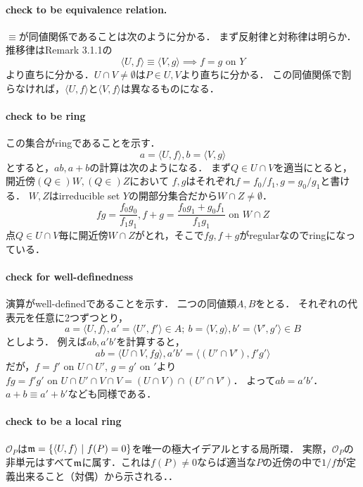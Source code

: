 \documentclass[a4paper]{jarticle}
\begin{document}
    \paragraph{check to be equivalence relation.}
    $\equiv$が同値関係であることは次のように分かる．
    まず反射律と対称律は明らか．
    推移律はRemark 3.1.1の
    \[ \langle U,f \rangle \equiv \langle V,g \rangle \implies f=g \mbox{ on } Y  \]
    より直ちに分かる．$U \cap V \neq \emptyset$は$P \in U, V$より直ちに分かる．
    この同値関係で割らなければ，$\langle U,f \rangle$と$\langle V,f \rangle$は異なるものになる．

    \paragraph{check to be ring}
    この集合がringであることを示す．
    \[ a=\langle U,f \rangle, b=\langle V,g \rangle \]
    とすると，$ab, a+b$の計算は次のようになる．
    まず$Q \in U \cap V$を適当にとると，開近傍$(Q \in )W, (Q \in )Z$において
    $f,g$はそれぞれ$f=f_0/f_1, g=g_0/g_1$と書ける．
    $W,Z$はirreducible set $Y$の開部分集合だから$W \cap Z \neq \emptyset$．
    \[ fg=\frac{f_0 g_0}{f_1 g_1}, f+g=\frac{f_0 g_1+g_0 f_1}{f_1 g_1} \mbox{ on } W \cap Z \]
    点$Q \in U \cap V$毎に開近傍$W \cap Z$がとれ，そこで$fg, f+g$がregularなのでringになっている．
    
    \paragraph{check for well-definedness}
    演算がwell-definedであることを示す．
    二つの同値類$A, B$をとる．
    それぞれの代表元を任意に2つずつとり，
    \[ a=\langle U,f \rangle, a'=\langle U',f' \rangle \in A;~ b=\langle V,g \rangle, b'=\langle V',g' \rangle \in B\]
    としよう．
    例えば$ab, a'b'$を計算すると，
    \[ ab=\langle U \cap V,fg \rangle, a'b'=\langle (U' \cap V'),f'g' \rangle \]
    だが，$f=f' \mbox{ on } U \cap U'$, $g=g' \mbox{ on } '$より
    $fg=f'g' \mbox{ on } U \cap U' \cap V \cap V=(U \cap V) \cap (U' \cap V')$．
    よって$ab=a'b'$．
    $a+b \equiv a'+b'$なども同様である．
    
    \paragraph{check to be a local ring}
    $\mathcal{O}_P$は$\mathfrak{m}=\{ \langle U,f \rangle ~|~ f(P)=0 \}$を唯一の極大イデアルとする局所環．
    実際，$\mathcal{O}_P$の非単元はすべて$\mathfrak{m}$に属す．これは$f(P) \neq 0$ならば適当な$P$の近傍の中で$1/f$が定義出来ること（対偶）から示される．．
\end{document}

